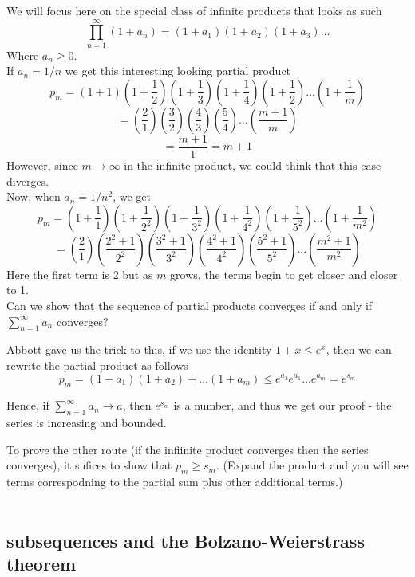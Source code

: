 We will focus here on the special class of infinite products that looks as such
$$
\prod^{\infty}_{n=1} (1 + a_n) = (1+a_1)(1+a_2)(1 +a_3)\ldots
$$
Where $a_n \geq 0$.
\\

If $a_n = 1/n$ we get this interesting looking partial product
$$
p_m = \left(1+1\right) \left(1+\frac{1}{2}\right) \left(1+\frac{1}{3}\right) \left(1+\frac{1}{4}\right) \left(1+\frac{1}{2}\right) \ldots \left(1+\frac{1}{m}\right)  
$$
$$
= \left(\frac{2}{1}\right) \left(\frac{3}{2}\right) \left(\frac{4}{3}\right) \left(\frac{5}{4}\right) \ldots \left(\frac{m+1}{m}\right) 
$$
$$
= \frac{m+1}{1} = m+1
$$
However, since $m \rightarrow \infty$ in the infinite product, we could think that this case diverges.
\\

Now, when $a_n = 1/n^2$, we get
$$
p_m =
\left(1+ \frac{1}{1} \right) \left(1+ \frac{1}{2^2} \right) \left(1+ \frac{1}{3^2} \right) \left(1+ \frac{1}{4^2} \right) \left(1+ \frac{1}{5^2} \right) \ldots \left(1+ \frac{1}{m^2} \right)
$$
$$
= \left(\frac{2}{1} \right) \left(\frac{2^2 +1}{2^2} \right) \left(\frac{3^2 +1}{3^2} \right) \left(\frac{4^2 +1}{4^2} \right) \left(\frac{5^2 +1}{5^2} \right) \ldots \left(\frac{m^2 +1}{m^2} \right)
$$
Here the first term is 2 but as $m$ grows, the terms begin to get closer and closer to 1.
\\


Can we show that the sequence of partial products converges if and only if
$\sum^{\infty}_{n=1} a_n$ converges?

Abbott gave us the trick to this, if we use the identity $1+x \leq e^x$, then we can rewrite the
partial product as follows
$$
p_m = (1+a_1) (1+a_2) + \ldots (1+a_m)
\leq e^{a_1} e^{a_1} \ldots e^{a_m}
= e^{s_m}
$$

Hence, if $\sum^{\infty}_{n=1} a_n \rightarrow a$, then $e^{s_m}$ is a number, and thus we get our
proof - the series is increasing and bounded.

To prove the other route (if the infiinite product converges then the series converges),
it sufices to show that $p_m \geq s_m$. (Expand the product and you will see terms correspodning to
the partial sum plus other additional terms.)
\\~\\



\subsection{subsequences and the Bolzano-Weierstrass theorem}


